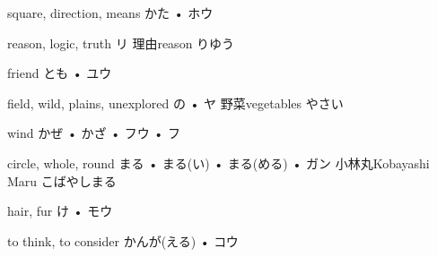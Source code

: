 



\setcounter{cardnum}{145}

		{square, direction, means}
		{かた • ホウ}
		{}{}
		{}{}
		{}{}
		{}{}
		{}{}

		{reason, logic, truth}
		{リ}
		{理由}{reason りゆう}
		{}{}
		{}{}
		{}{}
		{}{}

		{friend}
		{とも • ユウ}
		{}{}
		{}{}
		{}{}
		{}{}
		{}{}

		{field, wild, plains, unexplored}
		{の • ヤ}
		{野菜}{vegetables やさい}
		{}{}
		{}{}
		{}{}
		{}{}

		{wind}
		{かぜ • かざ • フウ • フ}
		{}{}
		{}{}
		{}{}
		{}{}
		{}{}

		{circle, whole, round}
		{まる • まる(い) • まる(める) • ガン}
		{小林丸}{Kobayashi Maru こばやしまる}
		{}{}
		{}{}
		{}{}
		{}{}

		{hair, fur}
		{け • モウ}
		{}{}
		{}{}
		{}{}
		{}{}
		{}{}

		{to think, to consider}
		{かんが(える) • コウ}
		{}{}
		{}{}
		{}{}
		{}{}
		{}{}

